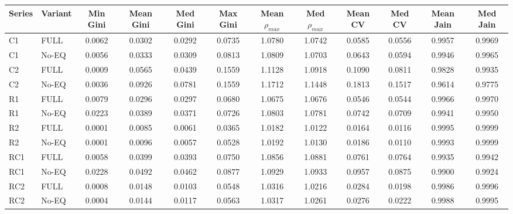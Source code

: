 \begin{tabular}{llcccccccccc}
\toprule
\textbf{Series} & \textbf{Variant} & \textbf{Min Gini} & \textbf{Mean Gini} & \textbf{Med Gini} & \textbf{Max Gini} & \textbf{Mean $\rho_{max}$} & \textbf{Med $\rho_{max}$} & \textbf{Mean CV} & \textbf{Med CV} & \textbf{Mean Jain} & \textbf{Med Jain} \\
\midrule
C1 & FULL & 0.0062 & 0.0302 & 0.0292 & 0.0735 & 1.0780 & 1.0742 & 0.0585 & 0.0556 & 0.9957 & 0.9969 \\
C1 & No-EQ & 0.0056 & 0.0333 & 0.0309 & 0.0813 & 1.0809 & 1.0703 & 0.0643 & 0.0594 & 0.9946 & 0.9965 \\
C2 & FULL & 0.0009 & 0.0565 & 0.0439 & 0.1559 & 1.1128 & 1.0918 & 0.1090 & 0.0811 & 0.9828 & 0.9935 \\
C2 & No-EQ & 0.0036 & 0.0926 & 0.0781 & 0.1559 & 1.1712 & 1.1448 & 0.1813 & 0.1517 & 0.9614 & 0.9775 \\
R1 & FULL & 0.0079 & 0.0296 & 0.0297 & 0.0680 & 1.0675 & 1.0676 & 0.0546 & 0.0544 & 0.9966 & 0.9970 \\
R1 & No-EQ & 0.0223 & 0.0389 & 0.0371 & 0.0726 & 1.0803 & 1.0781 & 0.0742 & 0.0709 & 0.9941 & 0.9950 \\
R2 & FULL & 0.0001 & 0.0085 & 0.0061 & 0.0365 & 1.0182 & 1.0122 & 0.0164 & 0.0116 & 0.9995 & 0.9999 \\
R2 & No-EQ & 0.0001 & 0.0096 & 0.0057 & 0.0528 & 1.0192 & 1.0130 & 0.0186 & 0.0110 & 0.9993 & 0.9999 \\
RC1 & FULL & 0.0058 & 0.0399 & 0.0393 & 0.0750 & 1.0856 & 1.0881 & 0.0761 & 0.0764 & 0.9935 & 0.9942 \\
RC1 & No-EQ & 0.0228 & 0.0492 & 0.0462 & 0.0877 & 1.0929 & 1.0933 & 0.0957 & 0.0875 & 0.9900 & 0.9924 \\
RC2 & FULL & 0.0008 & 0.0148 & 0.0103 & 0.0548 & 1.0316 & 1.0216 & 0.0284 & 0.0198 & 0.9986 & 0.9996 \\
RC2 & No-EQ & 0.0004 & 0.0144 & 0.0117 & 0.0563 & 1.0317 & 1.0261 & 0.0276 & 0.0222 & 0.9988 & 0.9995 \\
\bottomrule
\end{tabular}

